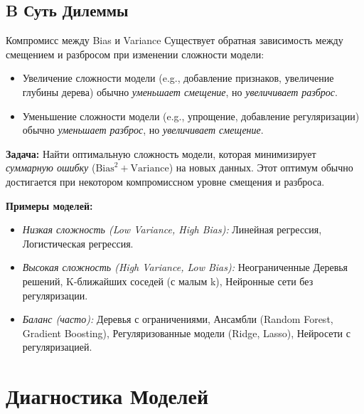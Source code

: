 \subsection{B Суть Дилеммы}
\begin{myblock}{Компромисс между Bias и Variance}
    Существует обратная зависимость между смещением и разбросом при изменении сложности модели:
    \begin{itemize}[nosep, leftmargin=*]
        \item Увеличение сложности модели (e.g., добавление признаков, увеличение глубины дерева) обычно \textit{уменьшает смещение}, но \textit{увеличивает разброс}.
        \item Уменьшение сложности модели (e.g., упрощение, добавление регуляризации) обычно \textit{уменьшает разброс}, но \textit{увеличивает смещение}.
    \end{itemize}
    \textbf{Задача:} Найти оптимальную сложность модели, которая минимизирует \textit{суммарную ошибку} ($\text{Bias}^2 + \text{Variance}$) на новых данных. Этот оптимум обычно достигается при некотором компромиссном уровне смещения и разброса.

    \textbf{Примеры моделей:}
    \begin{itemize}[nosep, leftmargin=*]
        \item \textit{Низкая сложность (Low Variance, High Bias):} Линейная регрессия, Логистическая регрессия.
        \item \textit{Высокая сложность (High Variance, Low Bias):} Неограниченные Деревья решений, K-ближайших соседей (с малым k), Нейронные сети без регуляризации.
        \item \textit{Баланс (часто):} Деревья с ограничениями, Ансамбли (Random Forest, Gradient Boosting), Регуляризованные модели (Ridge, Lasso), Нейросети с регуляризацией.
    \end{itemize}
\end{myblock}

\section{Диагностика Моделей}

